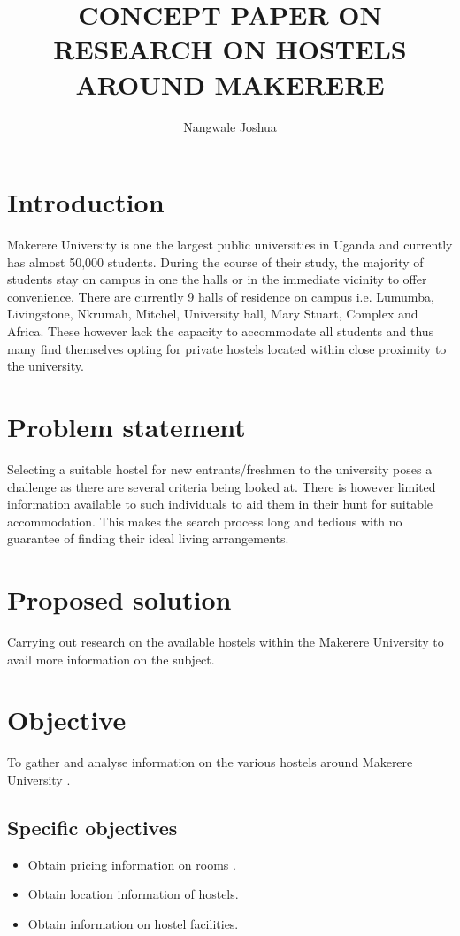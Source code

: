 \documentclass{article}
\begin{document}
\title{CONCEPT PAPER ON RESEARCH ON HOSTELS AROUND MAKERERE}
\author{Nangwale Joshua}
\maketitle

\section{Introduction}
Makerere University is one the largest public universities in Uganda and currently has almost 50,000 students. During the course of their study, the majority of students stay on campus in one the halls or in the immediate vicinity to offer convenience. There are currently 9 halls of residence on campus i.e. Lumumba, Livingstone, Nkrumah, Mitchel, University hall, Mary Stuart, Complex and Africa. These however lack the capacity to accommodate all students and thus many find themselves opting for private hostels located within close proximity to the university.

\section{Problem statement}
Selecting a suitable hostel for new entrants/freshmen to the university poses a challenge as there are several criteria being looked at. There is however limited information available to such individuals to aid them in their hunt for suitable accommodation. This makes the search process long and tedious with no guarantee of finding their ideal living arrangements.

\section{Proposed solution}
Carrying out research on the available hostels within the Makerere University to avail more information on the subject.

\section{Objective}
To gather and analyse information on the various hostels around  Makerere University .

\subsection{Specific objectives}
\begin{itemize}
\item Obtain pricing information on rooms .
\item Obtain location information of hostels.
\item Obtain information on hostel facilities.
\end{itemize}
\end{document}
